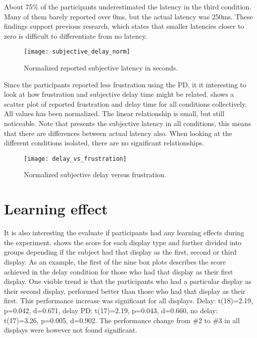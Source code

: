About 75\% of the participants underestimated the latency in the third condition. Many of them barely reported over 0ms, but the actual latency was 250ms. These findings support previous research, which states that smaller latencies closer to zero is difficult to differentiate from no latency.

\begin{figure}[h!]
    \centering
    \texttt{[image: subjective\_delay\_norm]}
    \caption{Normalized reported subjective latency in seconds.}
    \label{subjective_delay_norm}
\end{figure}

\clearpage
Since the participants reported less frustration using the PD, it it interesting to look at how frustration and subjective delay time might be related.  shows a scatter plot of reported frustration and delay time for all conditions collectively. All values has been normalized. The linear relationship is small, but still noticeable. Note that  presents the subjective latency in all conditions, this means that there are differences between actual latency also. When looking at the different conditions isolated, there are no significant relationships.

\begin{figure}[h!]
    \centering
    \texttt{[image: delay\_vs\_frustration]}
    \caption{Normalized subjective delay versus frustration.}
    \label{delay_vs_frustration}
\end{figure}

\clearpage
\section{Learning effect}

It is also interesting the evaluate if participants had any learning effects during the experiment.  shows the score for each display type and further divided into groups depending if the subject had that display as the first, second or third display. As an example, the first of the nine box plots describes the score achieved in the delay condition for those who had that display as their first display. One visible trend is that the participants who had a particular display as their second display, performed better than those who had that display as their first. This performance increase was significant for all displays. Delay: t(18)=2.19, p=0.042, d=0.671, delay PD: t(17)=2.19, p=0.043, d=0.660, no delay: t(17)=3.26, p=0.005, d=0.902. The performance change from \#2 to \#3 in all displays were however not found significant.


